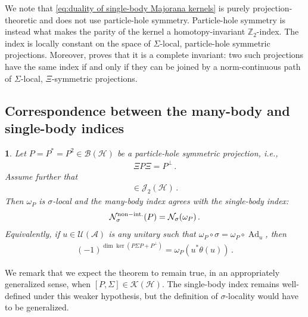 \documentclass[a4paper,10pt]{article}
\numberwithin{equation}{section}
\theoremstyle{plain}
\newtheorem{thm}{\protect\theoremname}[section]
\theoremstyle{plain}
\theoremstyle{plain}
\theoremstyle{plain}
\theoremstyle{plain}
\theoremstyle{remark}
\theoremstyle{definition}
\providecommand{\theoremname}{Theorem}
\newcommand{\ZZ}{\mathbb{Z}}
\newcommand{\calA}{\mathcal{A}}
\newcommand{\calB}{\mathcal{B}}
\newcommand{\calN}{\mathcal{N}}
\newcommand{\calU}{\mathcal{U}}
\newcommand{\calH}{\mathcal{H}}
\newcommand{\calK}{\mathcal{K}}
\newcommand{\calJ}{\mathcal{J}}
\newcommand{\Ad}[1]{\operatorname{Ad}_{#1}}
\newcommand{\eql}[1]{\begin{align}#1\end{align}}
\newcommand{\br}[1]{\left(#1\right)}
\begin{document}
We note that \cref{eq:duality of single-body Majorana kernels} is
purely projection-theoretic and does not use particle-hole symmetry.
Particle-hole symmetry is instead what makes the parity of the kernel
a homotopy-invariant $\ZZ_2$-index. The index is locally constant on
the space of $\Sigma$-local, particle-hole symmetric projections.
Moreover, \cite{ChungShapiro2023} proves that it is a complete
invariant: two such projections have the same index if and only if
they can be joined by a norm-continuous path of $\Sigma$-local,
$\Xi$-symmetric projections.

\subsection{Correspondence between the many-body and single-body indices}

\begin{thm}
Let $P=P^\ast=P^2\in\calB(\calH)$ be a particle-hole symmetric
projection, i.e.,
\eql{
    \Xi P\Xi=P^\perp\,.
}
Assume further that
\eql{
    [P,\Sigma]\in\calJ_2(\calH)\,.
}
Then $\omega_P$ is $\sigma$-local and the many-body index agrees with
the single-body index:
\eql{
    \calN_\sigma^{\rm non-int.}(P)
    =
    \calN_\sigma(\omega_P)\,.
}
Equivalently, if $u\in\calU(\calA)$ is any unitary such that
$\omega_P\circ\sigma=\omega_P\circ\Ad{u}$, then
\eql{\label{eq:single-body many-body correspondence}
    \br{-1}^{\dim\ker\br{P\Sigma P+P^\perp}}
    =
    \omega_P\br{u^\ast\theta(u)}\,.
}
\end{thm}

We remark that we expect the theorem to remain true, in an appropriately
generalized sense, when $[P,\Sigma]\in\calK(\calH)$. The single-body
index remains well-defined under this weaker hypothesis, but the
definition of $\sigma$-locality would have to be generalized.
\end{document}
